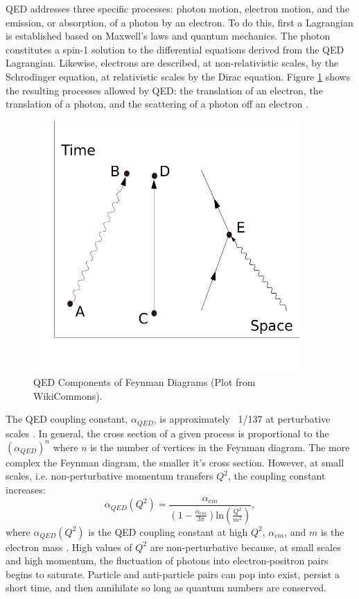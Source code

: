 QED addresses three specific processes: photon motion, electron motion, and the emission, or absorption, of a photon by an electron. To do this, first a Lagrangian is established based on Maxwell's laws and quantum mechanics. The photon constitutes a spin-1 solution to the differential equations derived from the QED Lagrangian. Likewise, electrons are described, at non-relativistic scales, by the Schrodinger equation, at relativistic scales by the Dirac equation. Figure \ref{fig:qedFeynman} shows the resulting processes allowed by QED: the translation of an electron, the translation of a photon, and the scattering of a photon off an electron \cite{Griffiths:2008zz}. 

\begin{figure}[h!]
\begin{centering}
\includegraphics[width=4in]{Chapter1/importfigs/Feynman_Diagram_Components.png}
\par\end{centering}
\caption{QED Components of Feynman Diagrams (Plot from WikiCommons). \label{fig:qedFeynman}}
\end{figure}

The QED coupling constant, $\alpha_{QED}$, is approximately ~1/137 at perturbative scales \cite{Bouchendira:2010es}. In general, the cross section of a given process is proportional to the $(\alpha_{QED})^n$ where $n$ is the number of vertices in the Feynman diagram. The more complex the Feynman diagram, the smaller it's cross section. However, at small scales, i.e. non-perturbative momentum transfers $Q^2$, the coupling constant increases:
\begin{equation}
\alpha_{QED}(Q^2) = \frac{ \alpha_{em}}{(1 - \frac{\alpha_{em}}{3\pi})\mathrm{ln}(\frac{Q^2}{m^2}) },
\end{equation}
where $\alpha_{QED}(Q^2)$ is the QED coupling constant at high $Q^2$, $\alpha_{em}$, and $m$ is the electron mass \cite{Abbiendi:2005rx}. High values of $Q^2$ are non-perturbative because, at small scales and high momentum, the fluctuation of photons into electron-positron pairs begins to saturate. Particle and anti-particle pairs can pop into exist, persist a short time, and then annihilate so long as quantum numbers are conserved. 

